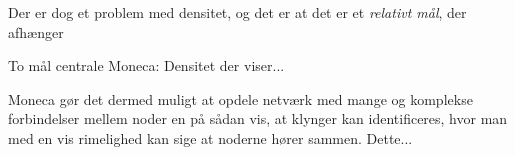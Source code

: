 Der er dog et problem med densitet, og det er at det er et \emph{relativt mål}, der afhænger



To mål centrale Moneca: Densitet der viser...




Moneca gør det dermed muligt at opdele netværk med mange og komplekse forbindelser mellem noder en på sådan vis, at klynger kan identificeres, hvor man med en vis rimelighed kan sige at noderne hører sammen. Dette...

